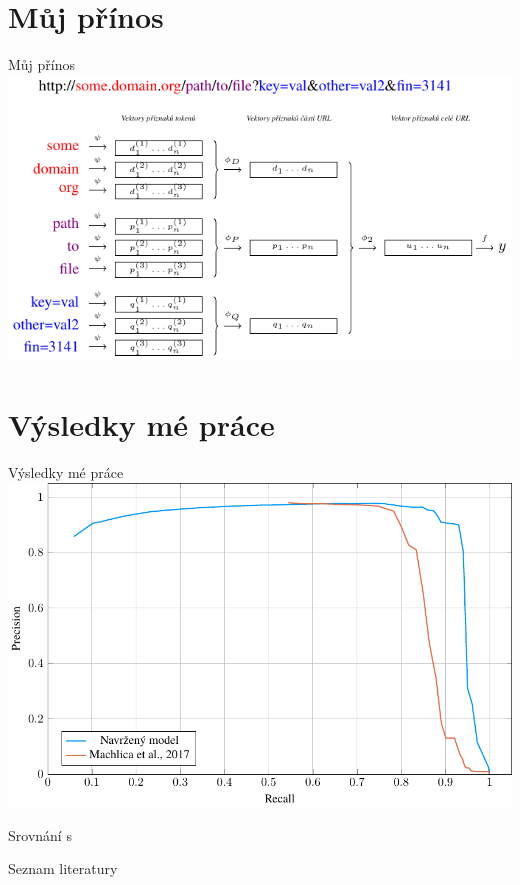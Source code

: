 \documentclass[10pt]{beamer}
\begin{document}
\section{Můj přínos}

\begin{frame}{Můj přínos}
	\includegraphics{images/model_modified_MIL/model_modified_MIL.pdf}

	\centering
\end{frame}

\section{Výsledky mé práce}
\begin{frame}{Výsledky mé práce}
	\centering
	\includegraphics[width=0.9\columnwidth]{images/prior_art/prior_art.pdf}

	Srovnání s \cite{machlica_learning_2017}
\end{frame}

\begin{frame}{Seznam literatury}
	\printbibliography
\end{frame}
\end{document}

